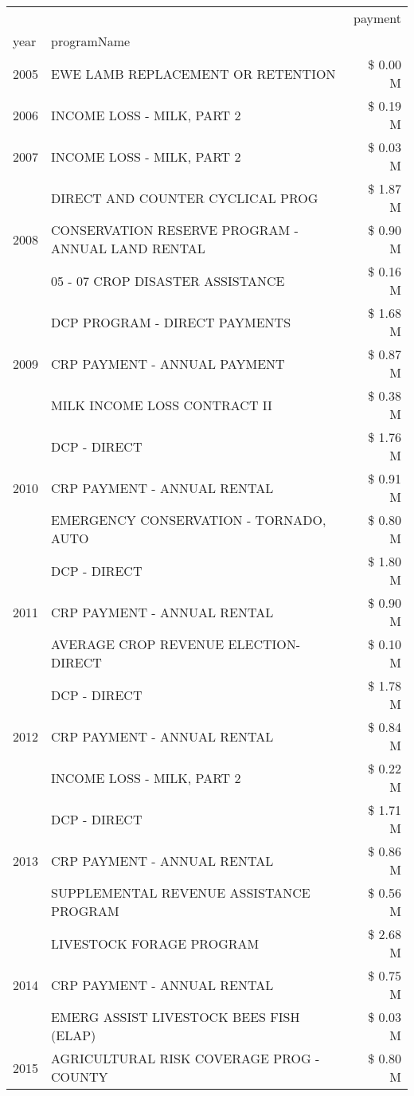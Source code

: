 \begin{tabular}{llr}
\toprule
 &  & payment \\
year & programName &  \\
\midrule
2005 & EWE LAMB REPLACEMENT OR RETENTION & \$ 0.00 M \\
\cline{1-3}
2006 & INCOME LOSS - MILK, PART 2 & \$ 0.19 M \\
\cline{1-3}
2007 & INCOME LOSS - MILK, PART 2 & \$ 0.03 M \\
\cline{1-3}
\multirow[t]{3}{*}{2008} & DIRECT AND COUNTER CYCLICAL PROG & \$ 1.87 M \\
 & CONSERVATION RESERVE PROGRAM - ANNUAL LAND RENTAL & \$ 0.90 M \\
 & 05 - 07 CROP DISASTER ASSISTANCE & \$ 0.16 M \\
\cline{1-3}
\multirow[t]{3}{*}{2009} & DCP PROGRAM - DIRECT PAYMENTS & \$ 1.68 M \\
 & CRP PAYMENT - ANNUAL PAYMENT & \$ 0.87 M \\
 & MILK INCOME LOSS CONTRACT II & \$ 0.38 M \\
\cline{1-3}
\multirow[t]{3}{*}{2010} & DCP - DIRECT & \$ 1.76 M \\
 & CRP PAYMENT - ANNUAL RENTAL & \$ 0.91 M \\
 & EMERGENCY CONSERVATION - TORNADO, AUTO & \$ 0.80 M \\
\cline{1-3}
\multirow[t]{3}{*}{2011} & DCP - DIRECT & \$ 1.80 M \\
 & CRP PAYMENT - ANNUAL RENTAL & \$ 0.90 M \\
 & AVERAGE CROP REVENUE ELECTION-DIRECT & \$ 0.10 M \\
\cline{1-3}
\multirow[t]{3}{*}{2012} & DCP - DIRECT & \$ 1.78 M \\
 & CRP PAYMENT - ANNUAL RENTAL & \$ 0.84 M \\
 & INCOME LOSS - MILK, PART 2 & \$ 0.22 M \\
\cline{1-3}
\multirow[t]{3}{*}{2013} & DCP - DIRECT & \$ 1.71 M \\
 & CRP PAYMENT - ANNUAL RENTAL & \$ 0.86 M \\
 & SUPPLEMENTAL REVENUE ASSISTANCE PROGRAM & \$ 0.56 M \\
\cline{1-3}
\multirow[t]{3}{*}{2014} & LIVESTOCK FORAGE PROGRAM & \$ 2.68 M \\
 & CRP PAYMENT - ANNUAL RENTAL & \$ 0.75 M \\
 & EMERG ASSIST LIVESTOCK BEES FISH (ELAP) & \$ 0.03 M \\
\cline{1-3}
\multirow[t]{3}{*}{2015} & AGRICULTURAL RISK COVERAGE PROG - COUNTY & \$ 0.80 M \\

\end{tabular}
